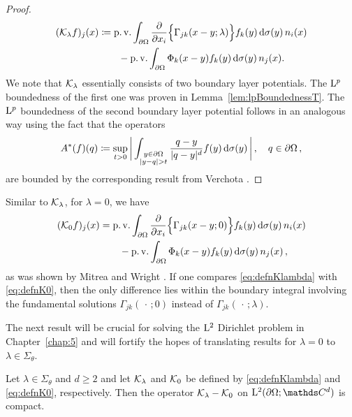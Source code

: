 \begin{proof}
\begin{align}
\begin{alignedat}{1}
    (\mathcal{K}_\lambda f)_j (x)
      &\coloneqq \operatorname{p. v.} \int_{\partial\Omega} \frac{\partial}{\partial x_i} \Big\{\Gamma_{jk}(x - y; \lambda) \Big\}  f_k(y) \, {\operatorname{d}\!{\sigma}}(y) \, n_i(x) \\
      &\qquad - \operatorname{p. v.} \int_{\partial\Omega} \Phi_k(x - y) f_k(y) \, {\operatorname{d}\!{\sigma}}(y)\, n_j(x).
    \end{alignedat}
  \end{align}
  We note that $\mathcal{K}_\lambda$ essentially consists of two boundary layer potentials. 
  The $\mathrm{L}^p$ boundedness of the first one was proven in Lemma~\ref{lem:lpBoundednessT}.
  The $\mathrm{L}^p$ boundedness of the second boundary layer potential follows in an analogous way using the fact that the operators
  \begin{align*}
    A^*(f)(q) \coloneqq \sup_{t > 0} \bigg| \int_{\substack{y \in \partial\Omega \\ |y - q| > t}} \frac{q - y}{|q - y|^d} f(y) \, {\operatorname{d}\!{\sigma}}(y)\, \bigg|\, , \quad q \in \partial\Omega\,,
  \end{align*}
  are bounded by the corresponding result from Verchota \cite[Lem.\@~1.2]{verchota}.
\end{proof}

Similar to $\mathcal{K}_\lambda$, for $\lambda = 0$, we have
\begin{align}
  \begin{alignedat}{1}
  \label{eq:defnK0}
    (\mathcal{K}_0 f)_j(x)&= \operatorname{p. v.} \int_{\partial\Omega} \frac{\partial}{\partial x_i} \Big\{ \Gamma_{jk}(x - y; 0) \Big\}  f_k(y) \, {\operatorname{d}\!{\sigma}}(y) \,n_i(x) \\
    &\qquad - \operatorname{p. v.} \int_{\partial\Omega} \Phi_k(x - y) f_k(y) \, {\operatorname{d}\!{\sigma}}(y)\, n_j(x)\,,
  \end{alignedat}
\end{align}
as was shown by Mitrea and Wright \cite[Prop.\@~4.4]{mitreaWright}.
If one compares \eqref{eq:defnKlambda} with \eqref{eq:defnK0}, then the only difference lies within the boundary integral involving the fundamental solutions $\Gamma_{jk}(\,\cdot\,; 0)$ instead of $\Gamma_{jk}(\,\cdot\,; \lambda)$.

The next result will be crucial for solving the $\mathrm{L}^2$ Dirichlet problem in Chapter~\ref{chap:5} and will fortify the hopes of translating results for $\lambda = 0$ to $\lambda \in \Sigma_\theta$.
\begin{lem}
  \label{lem:compactness}
  Let $\lambda \in \Sigma_\theta$ and $d \geq 2$ and let $\mathcal{K}_\lambda$ and $\mathcal{K}_0$ be defined by \eqref{eq:defnKlambda} and \eqref{eq:defnK0}, respectively.
  Then the operator $\mathcal{K}_\lambda - \mathcal{K}_0$ on $\Ell^2(\partial\Omega; \C^d)$ is compact.
\end{lem}

